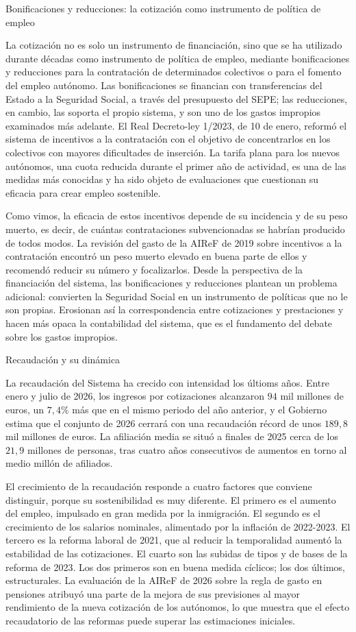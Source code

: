 \documentclass[10pt,a4paper]{article}
\begin{document}
Bonificaciones y reducciones: la cotización como instrumento de política de empleo

La cotización no es solo un instrumento de financiación, sino que se ha utilizado durante décadas como instrumento de política de empleo, mediante bonificaciones y reducciones para la contratación de determinados colectivos o para el fomento del empleo autónomo. Las bonificaciones se financian con transferencias del Estado a la Seguridad Social, a través del presupuesto del SEPE; las reducciones, en cambio, las soporta el propio sistema, y son uno de los gastos impropios examinados más adelante. El Real Decreto-ley 1/2023, de 10 de enero, reformó el sistema de incentivos a la contratación con el objetivo de concentrarlos en los colectivos con mayores dificultades de inserción. La tarifa plana para los nuevos autónomos, una cuota reducida durante el primer año de actividad, es una de las medidas más conocidas y ha sido objeto de evaluaciones que cuestionan su eficacia para crear empleo sostenible.

Como vimos, la eficacia de estos incentivos depende de su incidencia y de su peso muerto, es decir, de cuántas contrataciones subvencionadas se habrían producido de todos modos. La revisión del gasto de la AIReF de 2019 sobre incentivos a la contratación encontró un peso muerto elevado en buena parte de ellos y recomendó reducir su número y focalizarlos. Desde la perspectiva de la financiación del sistema, las bonificaciones y reducciones plantean un problema adicional: convierten la Seguridad Social en un instrumento de políticas que no le son propias. Erosionan así la correspondencia entre cotizaciones y prestaciones y hacen más opaca la contabilidad del sistema, que es el fundamento del debate sobre los gastos impropios.

Recaudación y su dinámica

La recaudación del Sistema ha crecido con intensidad los últioms años. Entre enero y julio de 2026, los ingresos por cotizaciones alcanzaron $94$ mil millones de euros, un $7,4\%$ más que en el mismo periodo del año anterior, y el Gobierno estima que el conjunto de 2026 cerrará con una recaudación récord de unos $189,8$ mil millones de euros. La afiliación media se situó a finales de 2025 cerca de los $21,9$ millones de personas, tras cuatro años consecutivos de aumentos en torno al medio millón de afiliados. 

El crecimiento de la recaudación responde a cuatro factores que conviene distinguir, porque su sostenibilidad es muy diferente. El primero es el aumento del empleo, impulsado en gran medida por la inmigración. El segundo es el crecimiento de los salarios nominales, alimentado por la inflación de 2022-2023. El tercero es la reforma laboral de 2021, que al reducir la temporalidad aumentó la estabilidad de las cotizaciones. El cuarto son las subidas de tipos y de bases de la reforma de 2023. Los dos primeros son en buena medida cíclicos; los dos últimos, estructurales. La evaluación de la AIReF de 2026 sobre la regla de gasto en pensiones atribuyó una parte de la mejora de sus previsiones al mayor rendimiento de la nueva cotización de los autónomos, lo que muestra que el efecto recaudatorio de las reformas puede superar las estimaciones iniciales.
\end{document}
